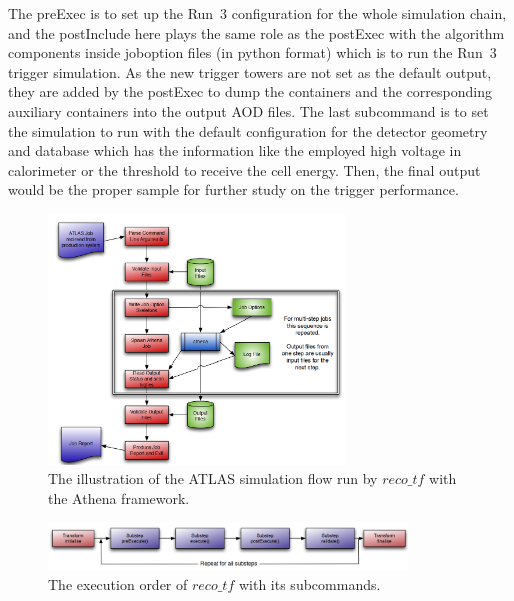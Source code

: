 \noindent
The preExec is to set up the Run~3 configuration for the whole simulation chain, and the postInclude here plays the same role as the postExec with the algorithm components inside joboption files (in python format) which is to run the Run~3 trigger simulation. As the new trigger towers are not set as the default output, they are added by the postExec to dump the containers and the corresponding auxiliary containers into the output AOD files. The last subcommand is to set the simulation to run with the default configuration for the detector geometry and database which has the information like the employed high voltage in calorimeter or the threshold to receive the cell energy. Then, the final output would be the proper sample for further study on the trigger performance.
\begin{figure}[!h]                
	\includegraphics[width=0.70\textwidth]{Chapter6/reco_tf.png}
	\begin{center}
		\caption{The illustration of the ATLAS simulation flow run by $reco\_tf$ with the Athena framework\cite{Stewart:2014ida}.}
		\label{Fig:reco_tf}            
	\end{center}
\end{figure}
\begin{figure}[!h]                
	\includegraphics[width=0.85\textwidth]{Chapter6/exeOrder.png}
	\begin{center}
		\caption{The execution order of $reco\_tf$ with its subcommands\cite{Stewart:2014ida}.}
		\label{Fig:exeOrder}            
	\end{center}
\end{figure}
 

